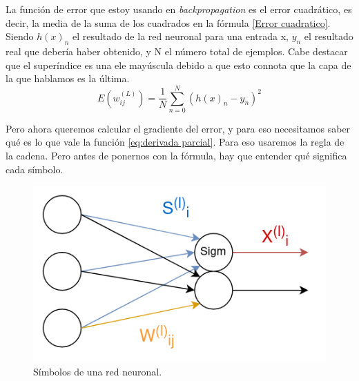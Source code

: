 La función de error que estoy usando en \textit{backpropagation} es el error cuadrático, es decir, la media de la suma de los cuadrados en la fórmula \ref{Error cuadratico}. Siendo $h(x)_n$ el resultado de la red neuronal para una entrada x, $y_n$ el resultado real que debería haber obtenido, y N el número total de ejemplos. Cabe destacar que el superíndice es una ele mayúscula debido a que esto connota que la capa de la que hablamos es la última.
\begin{equation}
	\label{Error cuadratico}
	E(w_{ij}^{(L)}) = \frac{1}{N}\sum_{n=0}^N(h(x)_n - y_n)^2
\end{equation}

Pero ahora queremos calcular el gradiente del error, y para eso necesitamos saber qué es lo que vale la función \ref{eq:derivada parcial}. Para eso usaremos la regla de la cadena. Pero antes de ponernos con la fórmula, hay que entender qué significa cada símbolo. 

\begin{figure}[H]
	\centering
	\includegraphics[width=15cm]{archivos/imagenes/Red-neuronal-simbolos.png}
	\caption{Símbolos de una red neuronal.}
	\label{fig:symb neural net}
\end{figure}

